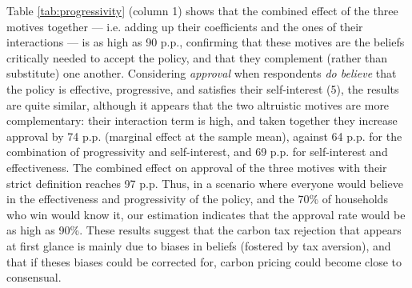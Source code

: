 \documentclass[12pt]{article} %
\begin{document}

Table \ref{tab:progressivity} (column 1) shows that the combined effect of the three motives together --- i.e. adding up their coefficients and the ones of their interactions --- is as high as 90 p.p., confirming that these motives are the beliefs critically needed to accept the policy, and that they complement (rather than substitute) one another. Considering \textit{approval} when respondents \textit{do believe} that the policy is effective, progressive, and satisfies their self-interest (5), the results are quite similar, although it appears that the two altruistic motives are more complementary: their interaction term is high, and taken together they increase approval by 74 p.p. (marginal effect at the sample mean), against 64 p.p. for the combination of progressivity and self-interest, and 69 p.p. for self-interest and effectiveness. The combined effect on approval of the three motives with their strict definition reaches 97 p.p. Thus, in a scenario where everyone would believe in the effectiveness and progressivity of the policy, and the 70\% of households who win would know it, our estimation indicates that the approval rate would be as high as 90\%. These results suggest that the carbon tax rejection that appears at first glance is mainly due to biases in beliefs (fostered by tax aversion), and that if theses biases could be corrected for, carbon pricing could become close to consensual.
\end{document}

